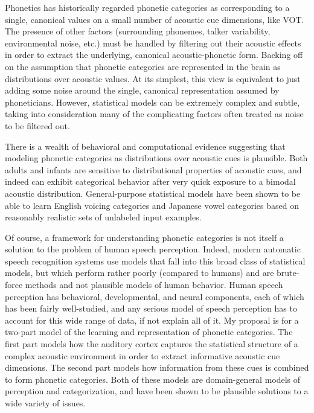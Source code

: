 \documentclass[12pt]{article}
\begin{document}
Phonetics has historically regarded phonetic categories as corresponding to a single, canonical values on a small number of acoustic cue dimensions, like VOT.  The presence of other factors (surrounding phonemes, talker variability, environmental noise, etc.) must be handled by filtering out their acoustic effects in order to extract the underlying, canonical acoustic-phonetic form.  Backing off on the assumption that phonetic categories are represented in the brain as distributions over acoustic values.  At its simplest, this view is equivalent to just adding some noise around the single, canonical representation assumed by phoneticians.  However, statistical models can be extremely complex and subtle, taking into consideration many of the complicating factors often treated as noise to be filtered out.

There is a wealth of behavioral and computational evidence suggesting that modeling phonetic categories as distributions over acoustic cues is plausible.  Both adults and infants are sensitive to distributional properties of acoustic cues, and indeed can exhibit categorical behavior after very quick exposure to a bimodal acoustic distribution.  General-purpose statistical models have been shown to be able to learn English voicing categories and Japanese vowel categories based on reasonably realistic sets of unlabeled input examples.

% 
Of course, a framework for understanding phonetic categories is not itself a solution to the problem of human speech perception.  Indeed, modern automatic speech recognition systems use models that fall into this broad class of statistical models, but which perform rather poorly (compared to humans) and are brute-force methods and not plausible models of human behavior.  Human speech perception has behavioral, developmental, and neural components, each of which has been fairly well-studied, and any serious model of speech perception has to account for this wide range of data, if not explain all of it.  My proposal is for a two-part model of the learning and representation of phonetic categories.  
The first part models how the auditory cortex captures the statistical structure of a complex acoustic environment in order to extract informative acoustic cue dimensions.
The second part models how information from these cues is combined to form phonetic categories.  
Both of these models are domain-general models of perception and categorization, and have been shown to be plausible solutions to a wide variety of issues.
\end{document}
